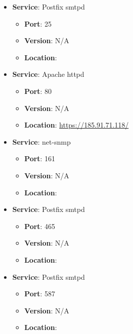 \documentclass{article}
\begin{document}
\begin{itemize}
    
        \item \textbf{Service}: Postfix smtpd
        \begin{itemize}
            \item \textbf{Port}: 25
            \item \textbf{Version}:  N/A 
            \item \textbf{Location}: \href{  }{  }
        \end{itemize}
    
        \item \textbf{Service}: Apache httpd
        \begin{itemize}
            \item \textbf{Port}: 80
            \item \textbf{Version}:  N/A 
            \item \textbf{Location}: \href{ https://185.91.71.118/ }{ https://185.91.71.118/ }
        \end{itemize}
    
        \item \textbf{Service}: net-snmp
        \begin{itemize}
            \item \textbf{Port}: 161
            \item \textbf{Version}:  N/A 
            \item \textbf{Location}: \href{  }{  }
        \end{itemize}
    
        \item \textbf{Service}: Postfix smtpd
        \begin{itemize}
            \item \textbf{Port}: 465
            \item \textbf{Version}:  N/A 
            \item \textbf{Location}: \href{  }{  }
        \end{itemize}
    
        \item \textbf{Service}: Postfix smtpd
        \begin{itemize}
            \item \textbf{Port}: 587
            \item \textbf{Version}:  N/A 
            \item \textbf{Location}: \href{  }{  }
        \end{itemize}
    
\end{itemize}
\end{document}
